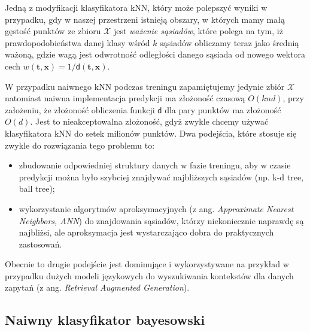 \documentclass{myclass}
\numberwithin{equation}{subsection}
\begin{document}
Jedną z modyfikacji klasyfikatora kNN, który może polepszyć wyniki w przypadku, gdy w naszej
przestrzeni istnieją obszary, w których mamy małą gęstość punktów ze zbioru \(\mathcal{X}\) jest
\emph{ważenie sąsiadów}, które polega na tym, iż prawdopodobieństwa danej klasy wśród \(k\) sąsiadów
obliczamy teraz jako średnią ważoną, gdzie wagą jest odwrotność odległości danego sąsiada od nowego
wektora cech \(w(\bm{t}, \bm{x}) = 1 / \mathsf{d}(\bm{t}, \bm{x})\).

W przypadku naiwnego kNN podczas treningu zapamiętujemy jedynie zbiór \(\mathcal{X}\) natomiast
naiwna implementacja predykcji ma złożoność czasową \(O(knd)\), przy założeniu, że złożoność
obliczenia funkcji \(\mathsf{d}\) dla pary punktów ma złożoność \(O(d)\). Jest to nieakceptowalna
złożoność, gdyż zwykle chcemy używać klasyfikatora kNN do setek milionów punktów. Dwa podejścia,
które stosuje się zwykle do rozwiązania tego problemu to: 
\begin{itemize}

    \item zbudowanie odpowiedniej struktury danych w fazie treningu, aby w czasie predykcji można
    było szybciej znajdywać najbliższych sąsiadów (np. k-d tree, ball tree);

    \item wykorzystanie algorytmów aproksymacyjnych (z ang. \textit{Approximate Nearest Neighbors,
    ANN}) do znajdowania sąsiadów, którzy niekoniecznie naprawdę są najbliżsi, ale aproksymacja jest
    wystarczająco dobra do praktycznych zastosowań.

\end{itemize}

Obecnie to drugie podejście jest dominujące i wykorzystywane na przykład w przypadku dużych modeli
językowych do wyszukiwania kontekstów dla danych zapytań (z ang. \textit{Retrieval Augmented
Generation}).


\subsection{Naiwny klasyfikator bayesowski}
\end{document}
